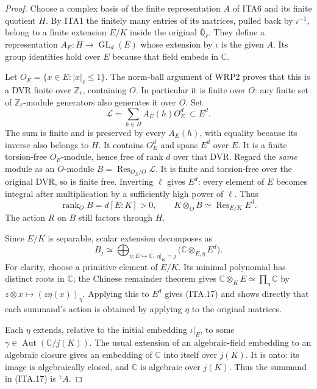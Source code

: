 \begin{proof}
Choose a complex basis of the finite representation $A$ of
ITA6 and its finite quotient $H$.  By ITA1 the finitely
many entries of its matrices, pulled back by $\iota^{-1}$,
belong to a finite extension $E/K$ inside the original
$\overline{\mathbb Q}_\ell$.  They define a representation
$A_E:H\to\operatorname{GL}_d(E)$ whose extension by
$\iota$ is the given $A$.  Its group identities hold over
$E$ because that field embeds in $\mathbb C$.

Let $O_E=\{x\in E:|x|_\ell\leq1\}$.  The norm-ball
argument of WRP2 proves that this is a DVR finite over
$\mathbb Z_\ell$, containing $O$.  In particular it is
finite over $O$: any finite set of $\mathbb Z_\ell$-module
generators also generates it over $O$.  Set
\[
                      \mathcal L=\sum_{h\in H}A_E(h)O_E^d
                                      \ \subset E^d.          \tag{ITA.15}
\]
The sum is finite and is preserved by every $A_E(h)$,
with equality because its inverse also belongs to $H$.
It contains $O_E^d$ and spans $E^d$ over $E$.
It is a finite torsion-free $O_E$-module, hence free of
rank $d$ over that DVR.  Regard the \emph{same} module as
an $O$-module $B=\operatorname{Res}_{O_E/O}\mathcal L$.
It is finite and torsion-free over the original DVR,
so is finite free.  Inverting $\ell$ gives $E^d$:
every element of $E$ becomes integral after multiplication
by a sufficiently high power of $\ell$.  Thus
\[
              \operatorname{rank}_O B=d[E:K]>0,
       \qquad K\otimes_O B\simeq\operatorname{Res}_{E/K}E^d.
                                                               \tag{ITA.16}
\]
The action $R$ on $B$ still factors through $H$.

Since $E/K$ is separable, scalar extension decomposes as
\[
 B_j\simeq
 \bigoplus_{\eta:E\hookrightarrow\mathbb C,\ \eta|_K=j}
                  \bigl(\mathbb C\otimes_{E,\eta}E^d\bigr).
                                                               \tag{ITA.17}
\]
For clarity, choose a primitive element of $E/K$.
Its minimal polynomial has distinct roots in $\mathbb C$;
the Chinese remainder theorem gives
$\mathbb C\otimes_K E\simeq\prod_\eta\mathbb C$
by $z\otimes x\mapsto(z\eta(x))_\eta$.  Applying this
to $E^d$ gives (ITA.17) and shows directly that each
summand's action is obtained by applying $\eta$ to the
original matrices.

Each $\eta$ extends, relative to the initial embedding
$\iota|_E$, to some $\gamma\in
\operatorname{Aut}(\mathbb C/j(K))$.  The usual extension
of an algebraic-field embedding to an algebraic closure
gives an embedding of $\mathbb C$ into itself over
$j(K)$.  It is onto: its image is algebraically closed,
and $\mathbb C$ is algebraic over $j(K)$.  Thus the
summand in (ITA.17) is ${}^{\gamma}A$.


\end{proof}
